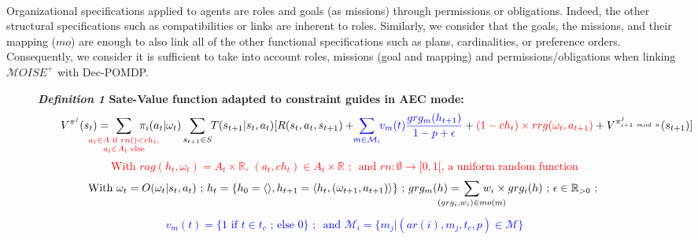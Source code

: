 \documentclass[sigconf,anonymous]{aamas}
\begin{document}
\

\noindent Organizational specifications applied to agents are roles and goals (as missions) through permissions or obligations. Indeed, the other structural specifications such as compatibilities or links are inherent to roles. Similarly, we consider that the goals, the missions, and their mapping ($mo$) are enough to also link all of the other functional specifications such as plans, cardinalities, or preference orders.
Consequently, we consider it is sufficient to take into account roles, missions (goal and mapping) and permissions/obligations when linking $\mathcal{M}OISE^+$ with Dec-POMDP. 

\begin{figure*}[t]
    \label{eq:single_value_function}
    \raggedright
    \textbf{\textit{Definition 1} \quad Sate-Value function adapted to constraint guides in AEC mode:}
    \begin{gather*}
      \text{\quad \quad} V^{\pi^j}(s_t) = \hspace{-0.75cm} \sum_{\textcolor{red}{ \substack{a_{t} \in A \text{ if } rn() < ch_{t}, \\ 
      a_{t} \in A_{t} \text{ else}}
      }}{\hspace{-0.7cm} \pi_i(a_{t} | \omega_t)} \sum_{s_{t+1} \in S}{\hspace{-0.1cm} T(s_{t+1} | s_t, a_{t})[R(s_t,a_{t},s_{t+1}) + \hspace{-0.1cm} \textcolor{blue}{ \sum_{m \in \mathcal{M}_i}{ \hspace{-0.1cm} v_m(t) \frac{grg_m(h_{t+1})}{1 - p + \epsilon} } } + \textcolor{red}{(1-ch_t) \times rrg(\omega_t,a_{t+1})} + V^{\pi^j_{i+1 \ mod \ n}}(s_{t+1})]}
    \end{gather*}  
    \textcolor{red}{\[\text{With } rag(h_t, \omega_t) = A_{t} \times \mathbb{R} \text{, } (a_t, ch_{t}) \in A_{t} \times \mathbb{R} \text{ ; } \text{ and } rn: \emptyset \to [0,1[ \text{, a uniform random function}\]}
    \vspace{-0.5cm}
    \textcolor{blue}{
    \begin{gather*}
    \text{With } \omega_t = O(\omega_t | s_t, a_t) \text{ ; } h_t = \{h_0 = \langle \rangle, h_{t+1} = \langle h_t, (\omega_{t+1}, a_{t+1}) \rangle \} \text{ ; } grg_m(h) = \hspace{-0.8cm} \sum_{(grg_i,w_i) \in mo(m)}{\hspace{-0.8cm} w_i \times grg_i(h)} \text{ ; } \epsilon \in \mathbb{R}_{>0} \text{ ; }
    \end{gather*}
    }
    \vspace{-0.75cm}
    \textcolor{blue}{
    \begin{gather*}
    v_m(t) = \{ 1 \text{ if } t \in t_c \text{ ; else } 0 \} \text{ ; } \text{ and } \mathcal{M}_i = \{m_j | (ar(i),m_j,t_c,p) \in \mathcal{M}\}
    \end{gather*}
    }
    \vspace{-0.6cm}
\end{figure*}
\end{document}
